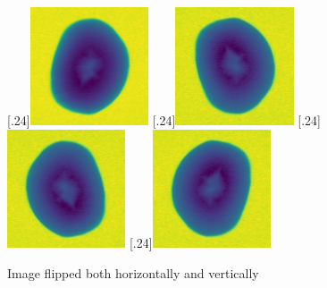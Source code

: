 \documentclass[11pt]{article}
\begin{document}
\begin{figure}[H]
\centering
{}
  [.24\textwidth]{\includegraphics[height=3.5cm]{figurer/hollow_15.jpg}}
  [.24\textwidth]{\includegraphics[height=3.5cm]{figurer/data_augmentation/hollow_15_flip1.jpg}}
  [.24\textwidth]{\includegraphics[height=3.5cm]{figurer/data_augmentation/hollow_15_flip2.jpg}}
  [.24\textwidth]{\includegraphics[height=3.5cm]{figurer/data_augmentation/hollow_15_flip3.jpg}}
 \caption{Image flipped both horizontally and vertically}
 \label{fig:data_augmentation_flipping}
\end{figure}
\end{document}
